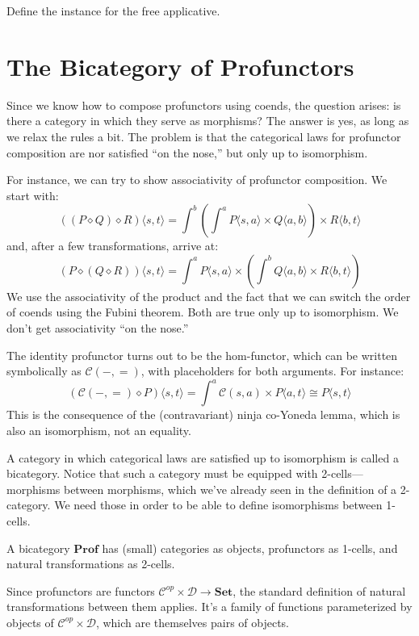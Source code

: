 \documentclass[DaoFP]{subfiles}
\begin{document}
\begin{exercise}
Define the  instance for the free applicative.
\end{exercise}


\section{The Bicategory of Profunctors}

Since we know how to compose profunctors using coends, the question arises: is there a category in which they serve as morphisms? The answer is yes, as long as we relax the rules a bit. The problem is that the categorical laws for profunctor composition are nor satisfied ``on the nose,'' but only up to isomorphism. 

For instance, we can try to show associativity of profunctor composition. We start with:
\[ ((P \diamond Q) \diamond R) \langle s, t \rangle = \int^b \left( \int^a P \langle s, a \rangle \times Q \langle a, b \rangle \right) \times R \langle b,  t \rangle \]
and, after a few transformations, arrive at:
\[ (P \diamond (Q \diamond R)) \langle s, t \rangle =  \int^a P \langle s, a \rangle \times \left( \int^b Q \langle a, b \rangle \times R \langle b,  t \rangle \right) \]
We use the associativity of the product and the fact that we can switch the order of coends using the Fubini theorem. Both are true only up to isomorphism. We don't get associativity ``on the nose.''

The identity profunctor turns out to be the hom-functor, which can be written symbolically as $\mathcal{C}(-, =)$, with placeholders for both arguments. For instance:
\[ \left( \mathcal{C}(-, =) \diamond P \right) \langle s, t \rangle = \int^a  \mathcal{C}(s, a) \times P \langle a, t \rangle \cong P \langle s, t \rangle \]
This is the consequence of the (contravariant) ninja co-Yoneda lemma, which is also an isomorphism, not an equality.

A category in which categorical laws are satisfied up to isomorphism is called a bicategory. Notice that such a category must be equipped with 2-cells---morphisms between morphisms, which we've already seen in the definition of a 2-category. We need those in order to be able to define isomorphisms between 1-cells. 

A bicategory $\mathbf{Prof}$ has (small) categories as objects, profunctors as 1-cells, and natural transformations as 2-cells. 

Since profunctors are functors $\mathcal{C}^{op} \times  \mathcal{D} \to \mathbf{Set}$, the standard definition of natural transformations between them applies. It's a family of functions parameterized by objects of $\mathcal{C}^{op} \times  \mathcal{D}$, which are themselves pairs of objects. 
\end{document}
